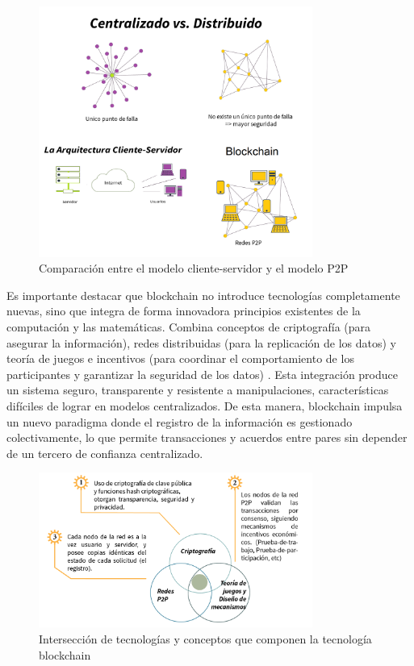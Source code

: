 \begin{figure}[!htpb]
    \centering
    \includegraphics[width=0.8\textwidth]{Figures/cliente-server-vs-p2p.png}
    \caption{Comparación entre el modelo cliente-servidor y el modelo P2P}
    \label{fig:web-architecture}
\end{figure}

Es importante destacar que blockchain no introduce tecnologías completamente nuevas, sino que integra de forma innovadora principios existentes de la computación y las matemáticas. Combina conceptos de criptografía (para asegurar la información), redes distribuidas (para la replicación de los datos) y teoría de juegos e incentivos (para coordinar el comportamiento de los participantes y garantizar la seguridad de los datos) \cite{sunny2022systematic, bulkowska2023implementation}. Esta integración produce un sistema seguro, transparente y resistente a manipulaciones, características difíciles de lograr en modelos centralizados. De esta manera, blockchain impulsa un nuevo paradigma donde el registro de la información es gestionado colectivamente, lo que permite transacciones y acuerdos entre pares sin depender de un tercero de confianza centralizado.

\begin{figure}[!htpb]
    \centering
    \includegraphics[width=0.8\textwidth]{Figures/venn-blockchain.png}
    \caption{Intersección de tecnologías y conceptos que componen la tecnología blockchain}
    \label{fig:blockchain-venn}
\end{figure}

